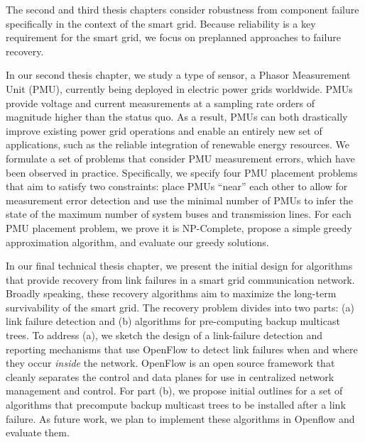 The second and third thesis chapters consider robustness from component failure specifically in the context of the smart grid. Because reliability is a key requirement for the smart grid, we focus on 
preplanned approaches to failure recovery.

In our second thesis chapter, we study a type of sensor, a Phasor Measurement Unit (PMU), currently being deployed in electric power grids worldwide. 
PMUs provide voltage and current measurements at a sampling rate orders of magnitude higher than the status quo.  As a result, PMUs can 
both drastically improve existing power grid operations and enable an entirely new set of applications, such as the reliable integration of renewable energy resources. 
We formulate a set of problems that consider PMU measurement errors, which have been observed in practice.  Specifically, we specify four PMU placement problems
that aim to satisfy two constraints: place PMUs ``near'' each other to allow for measurement error detection and use the minimal number of PMUs to infer the state of the maximum number of system buses and transmission lines. 
For each PMU placement problem, we prove it is NP-Complete, propose a simple greedy approximation algorithm, and evaluate our greedy solutions.

In our final technical thesis chapter, we present the initial design for algorithms that provide recovery from link failures in a smart grid communication network.  Broadly speaking, 
these recovery algorithms aim to maximize the long-term survivability of the smart grid.
The recovery problem divides into two parts: (a) link failure detection and (b) algorithms for pre-computing backup multicast trees.  
To address (a), we sketch the design of a link-failure detection and reporting mechanisms that use OpenFlow to detect link failures when and where they occur \emph{inside} the network.
OpenFlow is an open source framework that cleanly separates the control and data planes for use in centralized network management and control.
For part (b), we propose initial outlines for a set of algorithms that precompute backup multicast trees to be installed after a link failure.
As future work, we plan to implement these algorithms in Openflow and evaluate them.






